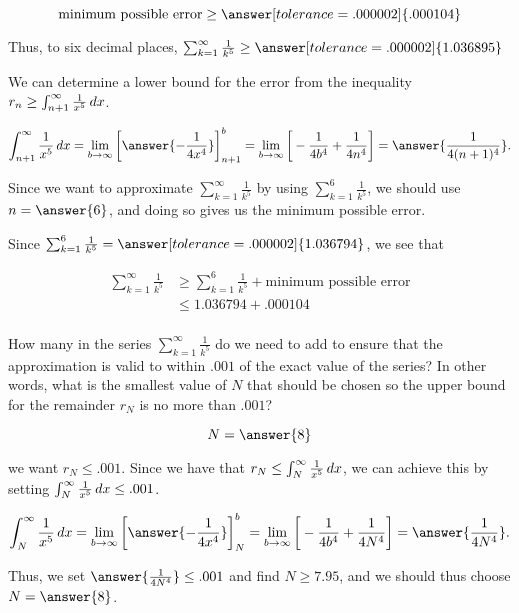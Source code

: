 \documentclass{ximera}
\begin{document}
\begin{exercise}
\begin{exercise}
\[
\textrm{minimum possible error} \geq \answer[tolerance=.000002]{.000104}
\]

Thus, to six decimal places, $\sum_{k=1}^{\infty} \frac{1}{k^5} \geq \answer[tolerance=.000002]{ 1.036895}$

\begin{hint}
We can determine a lower bound for the error from the inequality $ r_n \geq \int_{n+1}^{\infty} \frac{1}{x^5} \mathop{}\!d x$. 

\[
\int_{n+1}^\infty \frac{1}{x^5} \d x = \lim_{b \to \infty} \eval{\answer{-\frac{1}{4x^4}}}_{n+1}^b = \lim_{b \to \infty} \eval{-\frac{1}{4b^4}+\frac{1}{4n^4}} =\answer{\frac{1}{4(n+1)^4}}. 
\]

Since we want to approximate $\sum_{k=1}^{\infty} \frac{1}{k^5}$ by using $\sum_{k=1}^{6} \frac{1}{k^5}$, we should use $n=\answer{6}$, and doing so gives us the minimum possible error.

Since $\sum_{k=1}^{6} \frac{1}{k^5} = \answer[tolerance=.000002]{1.036794}$, we see that 

\begin{align*}
\sum_{k=1}^{\infty} \frac{1}{k^5} & \geq \sum_{k=1}^{6} \frac{1}{k^5} + \textrm{minimum possible error} \\
& \leq 1.036794 + .000104 \\
\end{align*}

\end{hint}
\end{exercise}


\begin{exercise}
How many in the series $\sum_{k=1}^{\infty} \frac{1}{k^5}$ do we need to add to ensure that the approximation is valid to within $.001$ of the exact value of the series?  In other words, what is the smallest value of $N$ that should be chosen so the upper bound for the remainder $r_N$ is no more than $.001$?

\[
N=\answer{8}
\]

\begin{hint}
we want $r_N \leq .001$.  Since we have that $r_N \leq \int_{N}^{\infty} \frac{1}{x^5} \mathop{}\!d x$, we can achieve this by setting $\int_{N}^{\infty} \frac{1}{x^5} \mathop{}\!d x \leq .001$. 

\[
\int_N^\infty \frac{1}{x^5} \d x = \lim_{b \to \infty} \eval{\answer{-\frac{1}{4x^4}}}_N^b = \lim_{b \to \infty} \eval{-\frac{1}{4b^4}+\frac{1}{4N^4}} =\answer{\frac{1}{4N^4}}. 
\]


Thus, we set $\answer{\frac{1}{4N^4}} \leq .001$ and find $N \geq 7.95$, and we should thus choose $N = \answer{8}$.
\end{hint}
\end{exercise}





\end{exercise}
\end{document}
